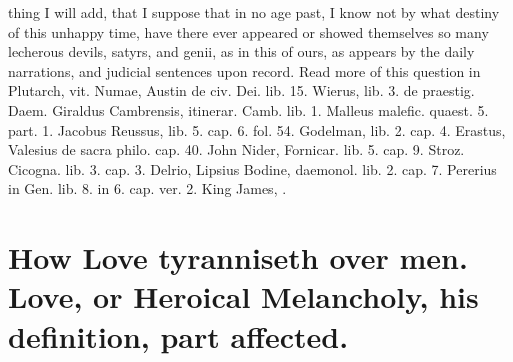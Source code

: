 {thing I will add, that I suppose that in no age past, I know not by
what destiny of this unhappy time, have there ever appeared or showed
themselves so many lecherous devils, satyrs, and genii, as in this of
ours, as appears by the daily narrations, and judicial sentences upon
record. Read more of this question in Plutarch, vit. Numae, Austin de
civ. Dei. lib. 15. Wierus, lib. 3. de praestig. Daem. Giraldus
Cambrensis, itinerar. Camb. lib. 1. Malleus malefic. quaest. 5. part.
1. Jacobus Reussus, lib. 5. cap. 6. fol. 54. Godelman, lib. 2. cap. 4.
Erastus, Valesius de sacra philo. cap. 40. John Nider, Fornicar. lib.
5. cap. 9. Stroz. Cicogna. lib. 3. cap. 3. Delrio, Lipsius Bodine,
daemonol. lib. 2. cap. 7. Pererius in Gen. lib. 8. in 6. cap. ver. 2.
King James, \etc{}.

\section[How Love tyranniseth over men.]{How Love tyranniseth over men. Love, or Heroical Melancholy, his definition, part affected.}

}

